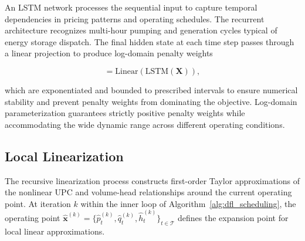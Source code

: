 \documentclass[journal]{IEEEtran}
\begin{document}
An LSTM network processes the sequential input to capture temporal dependencies in pricing patterns and operating schedules. The recurrent architecture recognizes multi-hour pumping and generation cycles typical of energy storage dispatch. The final hidden state at each time step passes through a linear projection to produce log-domain penalty weights

\begin{equation}
[\log \mathbf{w}_p, \log \mathbf{w}_q, \log \mathbf{w}_h] = \text{Linear}(\text{LSTM}(\mathbf{X})),
\label{eq:network_output_vector_explicit}
\end{equation}

which are exponentiated and bounded to prescribed intervals to ensure numerical stability and prevent penalty weights from dominating the objective. Log-domain parameterization guarantees strictly positive penalty weights while accommodating the wide dynamic range across different operating conditions.

\subsection{Local Linearization}
\label{subsec:local_linearization}

The recursive linearization process constructs first-order Taylor approximations of the nonlinear UPC and volume-head relationships around the current operating point. At iteration $k$ within the inner loop of Algorithm~\ref{alg:dfl_scheduling}, the operating point $\hat{\mathbf{x}}^{(k)} = \{\hat{p}_t^{(k)}, \hat{q}_t^{(k)}, \hat{h}_t^{(k)}\}_{t \in \mathcal{T}}$ defines the expansion point for local linear approximations. 
\end{document}
